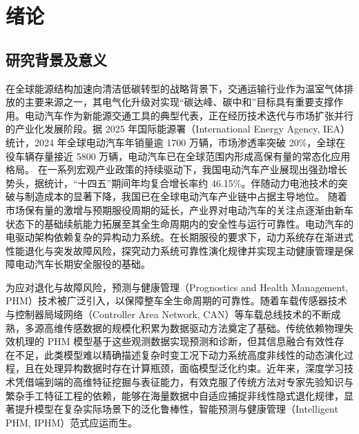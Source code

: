 \chapter{绪论}\label{chap:Intro}

\section{研究背景及意义}\label{sec:Intro_background_and_significance}

在全球能源结构加速向清洁低碳转型的战略背景下，交通运输行业作为温室气体排放的主要来源之一，其电气化升级对实现“碳达峰、碳中和”目标具有重要支撑作用。电动汽车作为新能源交通工具的典型代表，正在经历技术迭代与市场扩张并行的产业化发展阶段。据 2025 年国际能源署（International Energy Agency, IEA）统计\cite{iea2025global}，2024 年全球电动汽车年销量逾 1700 万辆，市场渗透率突破 20\%，全球在役车辆存量接近 5800 万辆，电动汽车已在全球范围内形成高保有量的常态化应用格局。
%
在一系列宏观产业政策的持续驱动下\cite{statecouncil2021carbon, statecouncil2020nev}，我国电动汽车产业展现出强劲增长势头，据统计，“十四五”期间年均复合增长率约 46.15\%。伴随动力电池技术的突破与制造成本的显著下降，我国已在全球电动汽车产业链中占据主导地位。
随着市场保有量的激增与预期服役周期的延长，产业界对电动汽车的关注点逐渐由新车状态下的基础续航能力拓展至其全生命周期内的安全性与运行可靠性\cite{geslin2025dynamic, nguyen2025closing}。电动汽车的电驱动架构依赖复杂的异构动力系统。在长期服役的要求下，动力系统存在渐进式性能退化与突发故障风险，探究动力系统可靠性演化规律并实现主动健康管理是保障电动汽车长期安全服役的基础\cite{zhao2025bridging, he2020electrical}。

为应对退化与故障风险，预测与健康管理（Prognostics and Health Management, PHM）技术被广泛引入，以保障整车全生命周期的可靠性。随着车载传感器技术与控制器局域网络（Controller Area Network, CAN）等车载总线技术的不断成熟，多源高维传感数据的规模化积累为数据驱动方法奠定了基础。传统依赖物理失效机理的 PHM 模型基于这些观测数据实现预测和诊断，但其信息融合有效性存在不足，此类模型难以精确描述复杂时变工况下动力系统高度非线性的动态演化过程，且在处理异构数据时存在计算瓶颈，面临模型泛化约束。近年来，深度学习技术凭借端到端的高维特征挖掘与表征能力，有效克服了传统方法对专家先验知识与繁杂手工特征工程的依赖，能够在海量数据中自适应捕捉非线性隐式退化规律，显著提升模型在复杂实际场景下的泛化鲁棒性，智能预测与健康管理（Intelligent PHM, IPHM）范式应运而生\cite{chen2025big, lei2025llmphm}。


